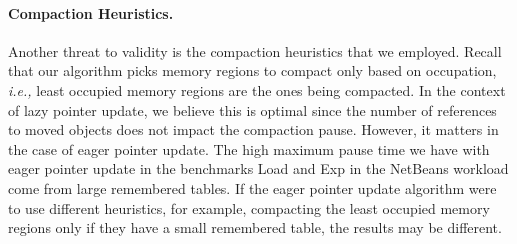 \documentclass[sigplan,10pt,review,anonymous]{acmart}\settopmatter{printfolios=true,printccs=false,printacmref=false}
\def\ie{\emph{i.e., }}
\begin{document}
%

\paragraph{Compaction Heuristics.} 
Another threat to validity is the compaction heuristics that we employed.
Recall that our algorithm picks memory regions to compact only based on occupation, \ie least occupied memory regions are the ones being compacted. In the context of lazy pointer update, we believe this is optimal since the number of references to moved objects does not impact the compaction pause. %
However, it matters in the case of eager pointer update. The high maximum pause time we have with eager pointer update in the benchmarks Load and Exp in the NetBeans workload come from large remembered tables. If the eager pointer update algorithm were to use different heuristics, for example, compacting the least occupied memory regions only if they have a small remembered table, the results may be different. 
\end{document}
